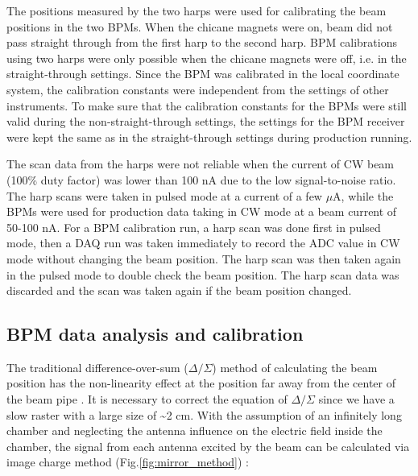 \documentclass[english,review,number,sort&compress]{elsarticle}
\begin{document}
The positions measured by the two harps were used for calibrating the beam positions in the two BPMs. When the chicane magnets were on, beam did not pass straight through from the first harp to the second harp. BPM calibrations using two harps were only possible when the chicane magnets were off, i.e. in the straight-through settings. Since the BPM was calibrated in the local coordinate system, the calibration constants were independent from the settings of other instruments. To make sure that the calibration constants for the BPMs were still valid during the non-straight-through settings, the settings for the BPM receiver were kept the same as in the straight-through settings during production running.

The scan data from the harps were not reliable when the current of CW beam (100\% duty factor) was lower than 100 nA due to the low signal-to-noise ratio. The harp scans were taken in pulsed mode at a current of a few $\mu$A, while the BPMs were used for production data taking in CW mode at a beam current of 50-100 nA. For a BPM calibration run, a harp scan was done first in pulsed mode, then a DAQ run was taken immediately to record the ADC value in CW mode without changing the beam position. The harp scan was then taken again in the pulsed mode to double check the beam position. The harp scan data was discarded and the scan was taken again if the beam position changed.


\subsection{BPM data analysis and calibration}

The traditional difference-over-sum ($\Delta/\Sigma$) method of calculating the beam position has the non-linearity effect at the position far away from the center of the beam pipe \citep{Barry301}. It is necessary to correct the equation of $\Delta/\Sigma$ since we have a slow raster with a large size of \textasciitilde{}2 cm. With the assumption of an infinitely long chamber and neglecting the antenna influence on the electric field inside the chamber, the signal from each antenna excited by the beam can be calculated via image charge method (Fig.\ref{fig:mirror_method}) \citep{carmanbpm,piotbpm} : 
\end{document}
